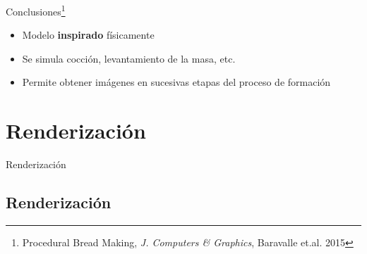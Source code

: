 \documentclass[spanish,unknownkeysallowed,10pt]{beamer}
\begin{document}
\begin{frame}{Conclusiones\footnote{Procedural Bread Making, {\it J. Computers \& Graphics}, Baravalle et.al. 2015}}
\begin{block}{}
\begin{itemize}
\item Modelo \textbf{inspirado} físicamente
\item Se simula cocción, levantamiento de la masa, etc.
\item Permite obtener imágenes en sucesivas etapas del proceso de formación
\end{itemize}
\end{block}
\end{frame}

\section{Renderización}


\begin{frame}
\begin{block}{}
\begin{center}
\vspace{1cm}
\huge{Renderización}
\vspace{1cm}
\end{center}
\end{block}
\end{frame}


\subsection{Renderización}
\end{document}
